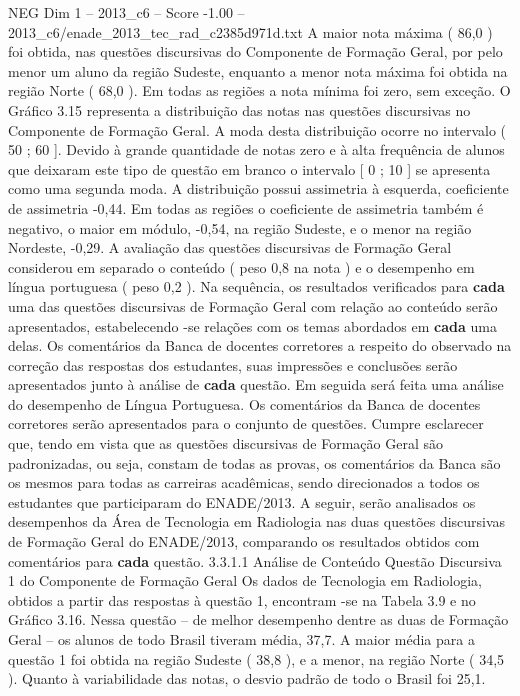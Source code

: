 \begin{textsample}{NEG Dim 1 – 2013\_c6 – Score -1.00 – 2013\_c6/enade\_2013\_tec\_rad\_c2385d971d.txt}
A maior nota máxima ( 86,0 ) foi obtida, nas questões discursivas do Componente de Formação Geral, por pelo menor um aluno da região Sudeste, enquanto a menor nota máxima foi obtida na região Norte ( 68,0 ).
Em todas as regiões a nota mínima foi zero, sem exceção.
O Gráfico 3.15 representa a distribuição das notas nas questões discursivas no Componente de Formação Geral.
A moda desta distribuição ocorre no intervalo ( 50 ; 60 ].
Devido à grande quantidade de notas zero e à alta frequência de alunos que deixaram este tipo de questão em branco o intervalo [ 0 ; 10 ] se apresenta como uma segunda moda.
A distribuição possui assimetria à esquerda, coeficiente de assimetria -0,44.
Em todas as regiões o coeficiente de assimetria também é negativo, o maior em módulo, -0,54, na região Sudeste, e o menor na região Nordeste, -0,29.
A avaliação das questões discursivas de Formação Geral considerou em separado o conteúdo ( peso 0,8 na nota ) e o desempenho em língua portuguesa ( peso 0,2 ).
Na sequência, os resultados verificados para \textbf{cada} uma das questões discursivas de Formação Geral com relação ao conteúdo serão apresentados, estabelecendo -se relações com os temas abordados em \textbf{cada} uma delas.
Os comentários da Banca de docentes corretores a respeito do observado na correção das respostas dos estudantes, suas impressões e conclusões serão apresentados junto à análise de \textbf{cada} questão.
Em seguida será feita uma análise do desempenho de Língua Portuguesa.
Os comentários da Banca de docentes corretores serão apresentados para o conjunto de questões.
Cumpre esclarecer que, tendo em vista que as questões discursivas de Formação Geral são padronizadas, ou seja, constam de todas as provas, os comentários da Banca são os mesmos para todas as carreiras acadêmicas, sendo direcionados a todos os estudantes que participaram do ENADE/2013.
A seguir, serão analisados os desempenhos da Área de Tecnologia em Radiologia nas duas questões discursivas de Formação Geral do ENADE/2013, comparando os resultados obtidos com comentários para \textbf{cada} questão. 3.3.1.1 Análise de Conteúdo Questão Discursiva 1 do Componente de Formação Geral Os dados de Tecnologia em Radiologia, obtidos a partir das respostas à questão 1, encontram -se na Tabela 3.9 e no Gráfico 3.16.
Nessa questão – de melhor desempenho dentre as duas de Formação Geral – os alunos de todo Brasil tiveram média, 37,7.
A maior média para a questão 1 foi obtida na região Sudeste ( 38,8 ), e a menor, na região Norte ( 34,5 ).
Quanto à variabilidade das notas, o desvio padrão de todo o Brasil foi 25,1.

\end{textsample}
